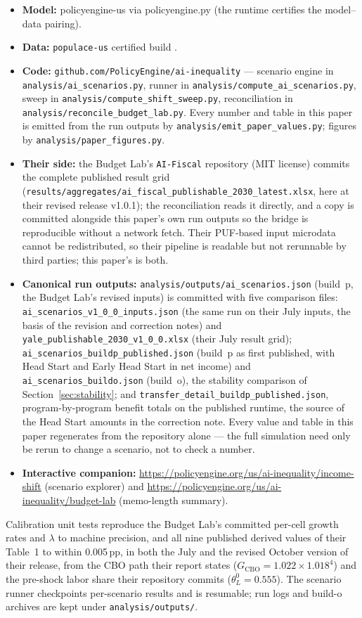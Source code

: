 \begin{itemize}
\item \textbf{Model:} policyengine-us \genModelVersion{} via policyengine.py
\genRunnerVersion{} (the runtime certifies the model--data pairing).
\item \textbf{Data:} \texttt{populace-us} certified build
\texttt{\genDataBuild}.
\item \textbf{Code:} \texttt{github.com/PolicyEngine/ai-inequality} ---
scenario engine in \texttt{analysis/ai\_scenarios.py}, runner in
\texttt{analysis/compute\_ai\_scenarios.py}, sweep in
\texttt{analysis/compute\_shift\_sweep.py}, reconciliation in
\texttt{analysis/reconcile\_budget\_lab.py}. Every number and table in this
paper is emitted from the run outputs by
\texttt{analysis/emit\_paper\_values.py}; figures by
\texttt{analysis/paper\_figures.py}.
\item \textbf{Their side:} the Budget Lab's \texttt{AI-Fiscal} repository
(MIT license) commits the complete published result grid
(\texttt{results/aggregates/ai\_fiscal\_publishable\_2030\_latest.xlsx},
here at their revised release v1.0.1); the reconciliation reads it directly,
and a copy is committed alongside this
paper's own run outputs so the bridge is reproducible without a network
fetch. Their PUF-based input microdata cannot be redistributed, so their
pipeline is readable but not rerunnable by third parties; this paper's is
both.
\item \textbf{Canonical run outputs:} \texttt{analysis/outputs/ai\_scenarios.json}
(build~p, the Budget Lab's revised inputs) is committed with five comparison
files: \texttt{ai\_scenarios\_v1\_0\_0\_inputs.json} (the same run on their
July inputs, the basis of the revision and correction notes) and
\texttt{yale\_publishable\_2030\_v1\_0\_0.xlsx} (their July result grid);
\texttt{ai\_scenarios\_buildp\_published.json} (build~p as first published,
with Head Start and Early Head Start in net income) and
\texttt{ai\_scenarios\_buildo.json} (build~o), the stability comparison of
Section~\ref{sec:stability}; and \texttt{transfer\_detail\_buildp\_published.json},
program-by-program benefit totals on the published runtime, the source of the
Head Start amounts in the correction note. Every value and table in this
paper regenerates from the repository alone --- the full simulation need only
be rerun to change a scenario, not to check a number.
\item \textbf{Interactive companion:}
\url{https://policyengine.org/us/ai-inequality/income-shift} (scenario
explorer) and \url{https://policyengine.org/us/ai-inequality/budget-lab}
(memo-length summary).
\end{itemize}

Calibration unit tests reproduce the Budget Lab's committed per-cell growth
rates and $\lambda$ to machine precision, and all nine published derived
values of their Table~1 to within 0.005\,pp, in both the July and the
revised October version of their release, from the CBO path their report
states ($G_{\mathrm{CBO}}=1.022\times1.018^4$) and the pre-shock labor share
their repository commits ($\theta^0_L=0.555$). The scenario runner checkpoints per-scenario
results and is resumable; run logs and build-o archives are kept under
\texttt{analysis/outputs/}.
